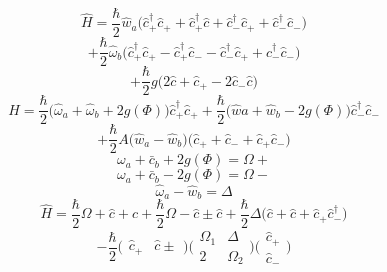 \begin{equation}
    \hat{H}=\frac{\hbar}{2} \hat{w}_{a}\biggl(\hat{c}_{+}^{\dagger} \hat{c}_{+}+\hat{c}_{+}^{\dagger} \hat{c}+\hat{c}_{-}^{\dagger} \hat{c}_{+}+\hat{c}_{-}^{\dagger} \hat{c}_{-}\biggr)
\end{equation}
\begin{equation}
    +\frac{\hbar}{2} \hat{\omega}_{b}\biggl(\hat{c}_{+}^{\dagger} \hat{c}_{+}-\hat{c}_{+}^{\dagger} \hat{c}_{-}-\hat{c}_{-}^{\dagger} \hat{c}_{+}+\hat{c}_{-}^{\dagger} \hat{c}_{-}\biggr)
\end{equation}
\begin{equation}
    +\frac{\hbar}{2} g\biggl(2 \hat{c}+\hat{c}_{+}-2 \hat{c}_{-} \hat{c}\biggr)
\end{equation}
\begin{equation}
    \hat{H}=\frac{\hbar}{2}\biggl(\hat{\omega}_{a}+\hat{\omega}_{b}+2 g(\Phi)\biggr) \hat{c}_{+}^{\dagger} \hat{c}_{+}+\frac{\hbar}{2}\biggl(\hat{w} a+\hat{w}_{b}-2 g(\Phi)\biggr) \hat{c}_{-}^{\dagger} \hat{c}_{-}
\end{equation}
\begin{equation}
    +\frac{\hbar}{2} A\biggl(\hat{w}_{a}-\hat{w}_{b}\biggr)\biggl(\hat{c}_{+}+\hat{c}_{-}+\hat{c}_{+} \hat{c}_{-}\biggr)
\end{equation}
\begin{equation}
    \omega_{a}+\bar{c}_{b}+2 g(\Phi)=\Omega+
\end{equation}
\begin{equation}
    \omega_{a}+\bar{c}_{b}-2 g(\Phi)=\Omega-
\end{equation}
\begin{equation}
    \hat{\omega}_{a}-\hat{w}_{b}=\Delta
\end{equation}
\begin{equation}
    \hat{H}=\frac{\hbar}{2} \Omega+\hat{c}+\hat{c}+\frac{\hbar}{2} \Omega-\hat{c} \pm \hat{c}+\frac{\hbar}{2} \Delta\biggl(\hat{c}+\hat{c}+\hat{c}_{+} \hat{c}_{-}^{\dagger}\biggr)
\end{equation}
\begin{equation}
    -\frac{\hbar}{2}\biggl(\begin{array}{cc}
    \hat{c}_{+} & \hat{c} \pm
    \end{array}\biggr)\biggl(\begin{array}{cc}
    \Omega_{1} & \Delta \\
    2 & \Omega_{2}
    \end{array}\biggr)\biggl(\begin{array}{l}
    \hat{c}_{+} \\
    \hat{c}_{-}
    \end{array}\biggr)
\end{equation}

